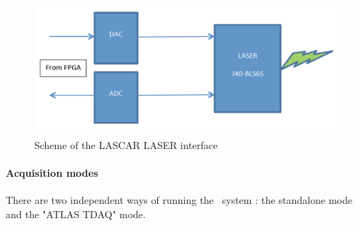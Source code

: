 \begin{figure}[htbp]

\centering
\includegraphics[height=5cm]{figures/laser_interface.pdf}
\caption{Scheme of the LASCAR LASER interface}\label{fig:laslascarlaserint}
\end{figure}

\paragraph{Acquisition modes}

There are two independent ways of running the \laser~system : the standalone mode and the "ATLAS TDAQ" mode.

